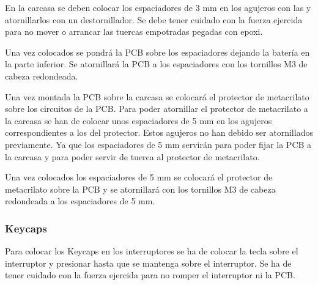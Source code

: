 En la carcasa se deben colocar los espaciadores de 3 mm en los agujeros con las  y atornillarlos con un destornillador. Se debe tener cuidado con la fuerza ejercida para no mover o arrancar las tuercas empotradas pegadas con epoxi.

Una vez colocados se pondrá la \gls{PCB} sobre los espaciadores dejando la batería en la parte inferior. Se atornillará la \gls{PCB} a los espaciadores con los tornillos M3 de cabeza redondeada.

Una vez montada la \gls{PCB} sobre la carcasa se colocará el protector de metacrilato sobre los circuitos de la \gls{PCB}. Para poder atornillar el protector de metacrilato a la carcasa se han de colocar unos espaciadores de 5 mm en los agujeros correspondientes a los del protector. Estos agujeros no han debido ser atornillados previamente. Ya que los espaciadores de 5 mm servirán para poder fijar la \gls{PCB} a la carcasa y para poder servir de tuerca al protector de metacrilato.

Una vez colocados los espaciadores de 5 mm se colocará el protector de metacrilato sobre la \gls{PCB} y se atornillará con los tornillos M3 de cabeza redondeada a los espaciadores de 5 mm.

\subsubsection{\gls{Keycaps}}
Para colocar los \gls{Keycaps} en los interruptores se ha de colocar la tecla sobre el interruptor y presionar hasta que se mantenga sobre el interruptor. Se ha de tener cuidado con la fuerza ejercida para no romper el interruptor ni la \gls{PCB}.